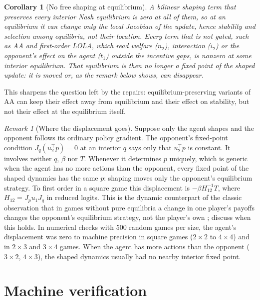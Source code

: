 \documentclass[11pt]{article}
\newtheorem{corollary}{Corollary}
\theoremstyle{remark}
\newtheorem{remark}{Remark}
\begin{document}
\begin{corollary}[No free shaping at equilibrium]\label{cor:nofree}
A bilinear shaping term that preserves every interior Nash equilibrium is zero at all of them, so at an equilibrium it can change only the local Jacobian of the update, hence stability and selection among equilibria, not their location. Every term that is not gated, such as AA and first-order LOLA, which read welfare ($n_2$), interaction ($i_2$) or the opponent's effect on the agent ($t_1$) outside the incentive gaps, is nonzero at some interior equilibrium. That equilibrium is then no longer a fixed point of the shaped update: it is moved or, as the remark below shows, can disappear.
\end{corollary}

This sharpens the question left by the repairs: equilibrium-preserving variants of AA can keep their effect away from equilibrium and their effect on stability, but not their effect at the equilibrium itself.

\begin{remark}[Where the displacement goes]
Suppose only the agent shapes and the opponent follows its ordinary policy gradient. The opponent's fixed-point condition $J_q(u_2^\top p)=0$ at an interior $q$ says only that $u_2^\top p$ is constant. It involves neither $q$, $\beta$ nor $T$. Whenever it determines $p$ uniquely, which is generic when the agent has no more actions than the opponent, every fixed point of the shaped dynamics has the same $p$: shaping moves only the opponent's equilibrium strategy. To first order in a square game this displacement is $-\beta H_{12}^{-1}T$, where $H_{12}=J_pu_1J_q$ in reduced logits. This is the dynamic counterpart of the classic observation that in games without pure equilibria a change in one player's payoffs changes the opponent's equilibrium strategy, not the player's own \citep{tsebelis1989}; \citet{weissing1991} discuss when this holds. In numerical checks with 500 random games per size, the agent's displacement was zero to machine precision in square games ($2\times2$ to $4\times4$) and in $2\times3$ and $3\times4$ games. When the agent has more actions than the opponent ($3\times2$, $4\times3$), the shaped dynamics usually had no nearby interior fixed point.
\end{remark}

\section{Machine verification}\label{sec:lean}
\end{document}
